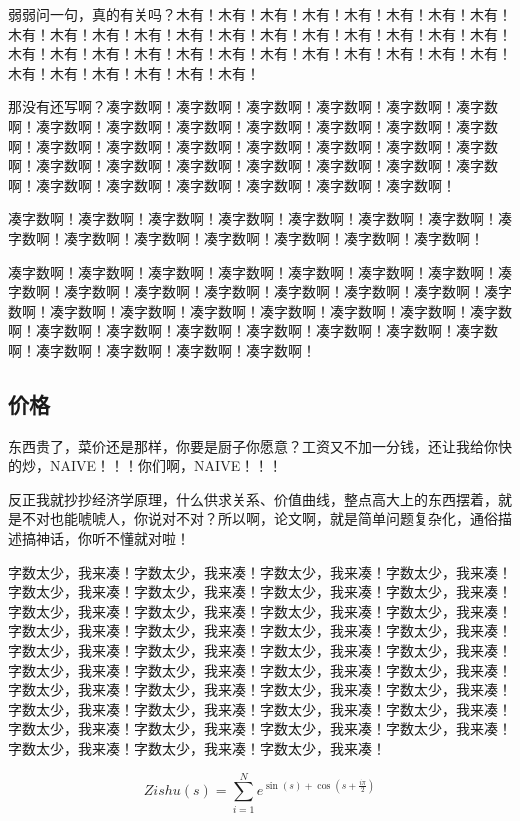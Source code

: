 \documentclass[a4paper,12pt]{book} %
\begin{document}
弱弱问一句，真的有关吗？木有！木有！木有！木有！木有！木有！木有！木有！木有！木有！木有！木有！木有！木有！木有！木有！木有！木有！木有！木有！木有！木有！木有！木有！木有！木有！木有！木有！木有！木有！木有！木有！木有！木有！木有！木有！木有！木有！

那没有还写啊？凑字数啊！凑字数啊！凑字数啊！凑字数啊！凑字数啊！凑字数啊！凑字数啊！凑字数啊！凑字数啊！凑字数啊！凑字数啊！凑字数啊！凑字数啊！凑字数啊！凑字数啊！凑字数啊！凑字数啊！凑字数啊！凑字数啊！凑字数啊！凑字数啊！凑字数啊！凑字数啊！凑字数啊！凑字数啊！凑字数啊！凑字数啊！凑字数啊！凑字数啊！凑字数啊！凑字数啊！凑字数啊！凑字数啊！

凑字数啊！凑字数啊！凑字数啊！凑字数啊！凑字数啊！凑字数啊！凑字数啊！凑字数啊！凑字数啊！凑字数啊！凑字数啊！凑字数啊！凑字数啊！凑字数啊！

凑字数啊！凑字数啊！凑字数啊！凑字数啊！凑字数啊！凑字数啊！凑字数啊！凑字数啊！凑字数啊！凑字数啊！凑字数啊！凑字数啊！凑字数啊！凑字数啊！凑字数啊！凑字数啊！凑字数啊！凑字数啊！凑字数啊！凑字数啊！凑字数啊！凑字数啊！凑字数啊！凑字数啊！凑字数啊！凑字数啊！凑字数啊！凑字数啊！凑字数啊！凑字数啊！凑字数啊！凑字数啊！凑字数啊！

\subsection{价格}
东西贵了，菜价还是那样，你要是厨子你愿意？工资又不加一分钱，还让我给你快的炒，NAIVE！！！你们啊，NAIVE！！！

反正我就抄抄经济学原理，什么供求关系、价值曲线，整点高大上的东西摆着，就是不对也能唬唬人，你说对不对？所以啊，论文啊，就是简单问题复杂化，通俗描述搞神话，你听不懂就对啦！

字数太少，我来凑！字数太少，我来凑！字数太少，我来凑！字数太少，我来凑！字数太少，我来凑！字数太少，我来凑！字数太少，我来凑！字数太少，我来凑！字数太少，我来凑！字数太少，我来凑！字数太少，我来凑！字数太少，我来凑！字数太少，我来凑！字数太少，我来凑！字数太少，我来凑！字数太少，我来凑！字数太少，我来凑！字数太少，我来凑！字数太少，我来凑！字数太少，我来凑！字数太少，我来凑！字数太少，我来凑！字数太少，我来凑！字数太少，我来凑！字数太少，我来凑！字数太少，我来凑！字数太少，我来凑！字数太少，我来凑！字数太少，我来凑！字数太少，我来凑！字数太少，我来凑！字数太少，我来凑！字数太少，我来凑！字数太少，我来凑！字数太少，我来凑！字数太少，我来凑！字数太少，我来凑！字数太少，我来凑！字数太少，我来凑！

$$Zishu(s) = \sum_{i=1}^{N}{e^{\sin(s) + \cos(s + \frac{i \pi}{2})}}$$
\end{document}
